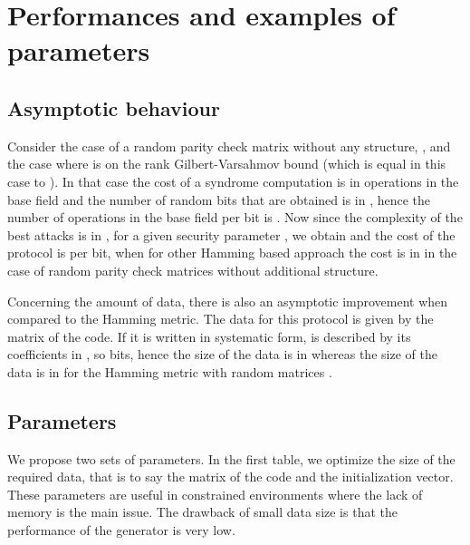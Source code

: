 \documentclass[11pt, a4paper]{llncs}
\begin{document}
 
\section{Performances and examples of parameters}

\subsection{Asymptotic behaviour}
Consider the case of a random parity check matrix without any structure,
,  
and the case where  is on the rank Gilbert-Varsahmov
bound (which is equal in this case to ). In that case the cost of a syndrome
computation is in  operations in the base field 
and the number of random bits that are obtained is in 
, hence the number of operations  in the base field  per bit is
. Now since the complexity of the best attacks is in ,
for a given security parameter , we obtain 
and the cost of the protocol is  per bit,
when for other Hamming based approach the cost is in 
in the case of random parity check matrices without additional  structure.

Concerning the amount of data, there is also an asymptotic improvement when compared to the Hamming metric. The data for this protocol is given by the matrix  of the code. If it is written in systematic form,  is described by its  coefficients in , so  bits, hence the size of the data  is in   whereas the size of the data is in  for the Hamming metric with random matrices \cite{FS86}.  



\subsection{Parameters}


We propose two sets of parameters. In the first table, we optimize the size of the required data, that is to say the matrix of the code and the initialization vector. These parameters are useful in constrained environments where the lack of memory is the main issue. The drawback of small data size is that the performance of the generator is very low.
\end{document}
